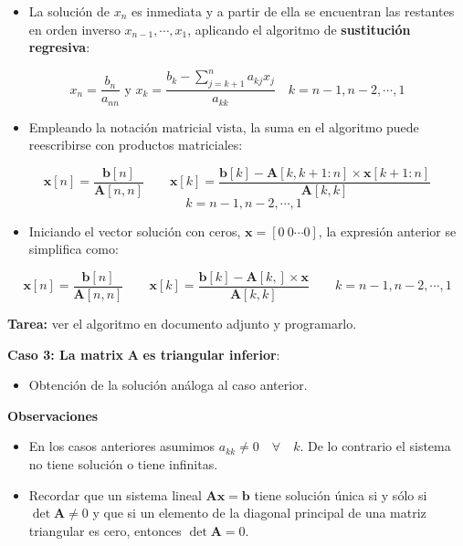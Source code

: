 \documentclass[openany]{book}
\providecommand{\tightlist}{%
  \setlength{\itemsep}{0pt}\setlength{\parskip}{0pt}}
\begin{document}
\begin{itemize}
\tightlist
\item
  La solución de \(x_n\) es inmediata y a partir de ella se encuentran las restantes en orden inverso \(x_{n-1}, \cdots, x_1\), aplicando el algoritmo de \textbf{sustitución regresiva}:
\end{itemize}

\[
x_n = \frac{b_n}{a_{nn}} \text{ y } x_k = \frac{b_k - \sum_{j = k+1}^{n}a_{kj}x_j}{a_{kk}} \quad k = n-1, n-2, \cdots, 1
\]

\begin{itemize}
\tightlist
\item
  Empleando la notación matricial vista, la suma en el algoritmo puede reescribirse con productos matriciales:
\end{itemize}

\[
\mathbf{x}[n] = \frac{\mathbf{b}[n]}{\mathbf{A}[n,n]} \qquad \mathbf{x}[k] = \frac{\mathbf{b}[k] - \mathbf{A}[k, k+1 : n] \times \mathbf{x}[k+1 : n]}{\mathbf{A}[k,k]}
\]
\[
\quad k = n-1, n-2, \cdots, 1
\]

\begin{itemize}
\tightlist
\item
  Iniciando el vector solución con ceros, \(\mathbf{x} = [0 ~ 0 \cdots 0]\), la expresión anterior se simplifica como:
\end{itemize}

\[
\mathbf{x}[n] = \frac{\mathbf{b}[n]}{\mathbf{A}[n,n]} \qquad \mathbf{x}[k] = \frac{\mathbf{b}[k] - \mathbf{A}[k, ] \times \mathbf{x}}{\mathbf{A}[k,k]}
\qquad k = n-1, n-2, \cdots, 1
\]

\textbf{Tarea:} ver el algoritmo en documento adjunto y programarlo.

\textbf{Caso 3: La matrix} \(\mathbf{A}\) \textbf{es triangular inferior}:

\begin{itemize}
\tightlist
\item
  Obtención de la solución análoga al caso anterior.
\end{itemize}

\textbf{Observaciones}

\begin{itemize}
\tightlist
\item
  En los casos anteriores asumimos \(a_{kk} \neq 0 \quad \forall \quad k\). De lo contrario el sistema no tiene solución o tiene infinitas.
\item
  Recordar que un sistema lineal \(\mathbf{Ax=b}\) tiene solución única si y sólo si \(\det \mathbf{A} \neq 0\) y que si un elemento de la diagonal principal de una matriz triangular es cero, entonces \(\det \mathbf{A} = 0\).
\end{itemize}
\end{document}

